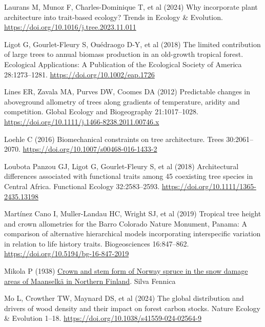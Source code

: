 \documentclass[
  12pt,
  letterpaper,
  DIV=11,
  numbers=noendperiod]{scrartcl}
\newlength{\cslhangindent}
\newlength{\cslentryspacingunit} %
\newenvironment{CSLReferences}[2] %
 {%
  \setlength{\parindent}{0pt}
  \ifodd #1
  \let\oldpar\par
  \def\par{\hangindent=\cslhangindent\oldpar}
  \fi
  \setlength{\parskip}{#2\cslentryspacingunit}
 }%
 {}
\begin{document}
\begin{CSLReferences}{1}{0}
\leavevmode{}%
Laurans M, Munoz F, Charles-Dominique T, et al (2024) Why incorporate
plant architecture into trait-based ecology? Trends in Ecology \&
Evolution. \url{https://doi.org/10.1016/j.tree.2023.11.011}

\leavevmode{}%
Ligot G, Gourlet-Fleury S, Ouédraogo D-Y, et al (2018) The limited
contribution of large trees to annual biomass production in an
old-growth tropical forest. Ecological Applications: A Publication of
the Ecological Society of America 28:1273--1281.
\url{https://doi.org/10.1002/eap.1726}

\leavevmode{}%
Lines ER, Zavala MA, Purves DW, Coomes DA (2012) Predictable changes in
aboveground allometry of trees along gradients of temperature, aridity
and competition. Global Ecology and Biogeography 21:1017--1028.
\url{https://doi.org/10.1111/j.1466-8238.2011.00746.x}

\leavevmode{}%
Loehle C (2016) Biomechanical constraints on tree architecture. Trees
30:2061--2070. \url{https://doi.org/10.1007/s00468-016-1433-2}

\leavevmode{}%
Loubota Panzou GJ, Ligot G, Gourlet-Fleury S, et al (2018) Architectural
differences associated with functional traits among 45 coexisting tree
species in {Central} {Africa}. Functional Ecology 32:2583--2593.
\url{https://doi.org/10.1111/1365-2435.13198}

\leavevmode{}%
Martínez Cano I, Muller-Landau HC, Wright SJ, et al (2019) Tropical tree
height and crown allometries for the {Barro} {Colorado} {Nature}
{Monument}, {Panama}: A comparison of alternative hierarchical models
incorporating interspecific variation in relation to life history
traits. Biogeosciences 16:847--862.
\url{https://doi.org/10.5194/bg-16-847-2019}

\leavevmode{}%
Mikola P (1938) \href{https://www.silvafennica.fi/article/4546}{Crown
and stem form of {Norway} spruce in the snow damage areas of {Maanselkä}
in {Northern} {Finland}}. Silva Fennica

\leavevmode{}%
Mo L, Crowther TW, Maynard DS, et al (2024) The global distribution and
drivers of wood density and their impact on forest carbon stocks. Nature
Ecology \& Evolution 1--18.
\url{https://doi.org/10.1038/s41559-024-02564-9}


\end{CSLReferences}
\end{document}
